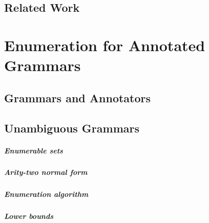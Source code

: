 \documentclass[pdftex]{pucthesis}	%
\begin{document}
\section{Related Work}\label{nested:relwork}





\chapter[ENUMERATION FOR ANNOTATED GRAMMARS]{Enumeration for Annotated Grammars} \label{ch2}



\section{Grammars and Annotators}\label{gram:sec:models}



\section{Unambiguous Grammars} \label{gram:sec:cubic}



\paragraph{Enumerable sets}


\paragraph{Arity-two normal form}


\paragraph{Enumeration algorithm}


\paragraph{Lower bounds}

\end{document}
